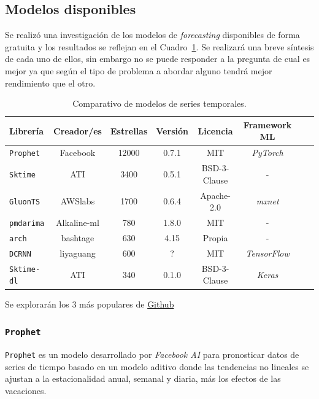 \documentclass[a4paper,12pt]{article}
\begin{document}
\subsection{Modelos disponibles}

Se realizó una investigación de los modelos de \textit{forecasting} disponibles de forma gratuita y los resultados se reflejan en el Cuadro~\ref{tab:ts-models}. Se realizará una breve síntesis de cada uno de ellos, sin embargo no se puede responder a la pregunta de cual es mejor ya que según el tipo de problema a abordar alguno tendrá mejor rendimiento que el otro.

\begin{table}[H]
\centering
\begin{tabular}{l|ccccccc}
\textbf{Librería} & \textbf{Creador/es}   & \textbf{Estrellas} & Versión     & Licencia     & Framework ML \\ \hline
\texttt{Prophet}          & Facebook                      & 12000              & 0.7.1          & MIT          & \textit{PyTorch}      \\
\texttt{Sktime}           & ATI  & 3400               & 0.5.1          & BSD-3-Clause & -            \\
\texttt{GluonTS}          & AWSlabs                           & 1700               & 0.6.4        & Apache-2.0   & \textit{mxnet}        \\
\texttt{pmdarima}         & Alkaline-ml                          & 780                & 1.8.0          & MIT          & -            \\
\texttt{arch}             & bashtage                                    & 630                & 4.15           & Propia       & -            \\
\texttt{DCRNN}            & liyaguang                                  & 600          &  ?                    & MIT          & \textit{TensorFlow}   \\
\texttt{Sktime-dl}        & ATI                    & 340                & 0.1.0   & BSD-3-Clause & \textit{Keras}       
\end{tabular}
\caption{Comparativo de modelos de series temporales.}
\label{tab:ts-models}
\end{table}

Se explorarán los 3 más populares de \href{http://www.github.com}{Github} 

\subsubsection{\texttt{Prophet}}
\texttt{Prophet} es un modelo desarrollado por \textit{Facebook AI} para pronosticar datos de series de tiempo basado en un modelo aditivo donde las tendencias no lineales se ajustan a la estacionalidad anual, semanal y diaria, más los efectos de las vacaciones. \citep{prophet}
\end{document}
